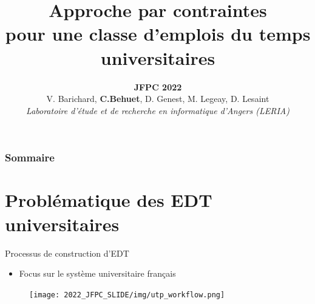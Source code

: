 \documentclass{beamer}
\author[C. Behuet]{
\textbf{JFPC 2022}\\
V. Barichard,\textbf{ C.Behuet}, D. Genest, M. Legeay, D. Lesaint\\
\textit{Laboratoire d’étude et de recherche en informatique d’Angers (LERIA)}\\ 
}
\institute[LERIA]{}
\title[Conception d'emplois du temps universitaires ]{Approche par contraintes\\ pour une classe d’emplois du temps universitaires}
\date{}
\newcommand{\nomplan}{Sommaire}
\begin{document}
\begin{frame}
    \titlepage
    
\end{frame}

\begin{frame}
\frametitle{\nomplan}
\tableofcontents
\end{frame}


\section{Problématique des EDT universitaires}

\begin{frame}{Processus de construction d'EDT}

\begin{itemize}
\centering
\item Focus sur le système universitaire français
\end{itemize}

        \begin{figure}
            \centering
            \texttt{[image: 2022\_JFPC\_SLIDE/img/utp\_workflow.png]}
        \end{figure}
    

\end{frame}
\end{document}
